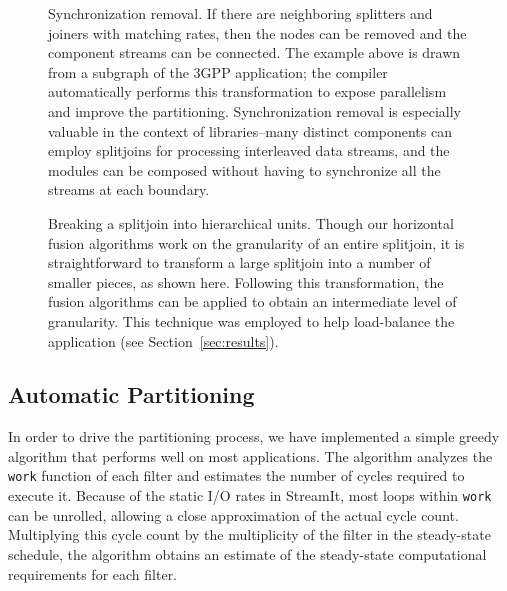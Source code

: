 \begin{figure}[t]
\centering
{}
\vspace{-1pt}
\caption{\protect\small Synchronization removal.  If there are
neighboring splitters and joiners with matching rates, then the nodes
can be removed and the component streams can be connected.  The
example above is drawn from a subgraph of the 3GPP application; the
compiler automatically performs this transformation to expose
parallelism and improve the partitioning.  Synchronization removal
is especially valuable in the context of libraries--many distinct
components can employ splitjoins for processing interleaved data
streams, and the modules can be composed without having to synchronize
all the streams at each boundary.  \protect\label{fig:sync-removal}}
\vspace{-7pt}
\end{figure}

\begin{figure}[t]
\centering
{} 
\vspace{-6pt}
\caption{\protect\small Breaking a splitjoin into hierarchical units.
Though our horizontal fusion algorithms work on the granularity of an
entire splitjoin, it is straightforward to transform a large splitjoin
into a number of smaller pieces, as shown here.  Following this
transformation, the fusion algorithms can be applied to obtain an
intermediate level of granularity.  This technique was employed to
help load-balance the \Radar~ application (see Section~\ref{sec:results}).
\protect\label{fig:splitjoin-split}}
\vspace{-18pt}
\end{figure}

\subsection{Automatic Partitioning}

In order to drive the partitioning process, we have implemented a
simple greedy algorithm that performs well on most applications.  The
algorithm analyzes the {\tt work} function of each filter and
estimates the number of cycles required to execute it.  Because of the
static I/O rates in StreamIt, most loops within {\tt work} can be
unrolled, allowing a close approximation of the actual cycle count.
Multiplying this cycle count by the multiplicity of the filter in the
steady-state schedule, the algorithm obtains an estimate of the
steady-state computational requirements for each filter.

